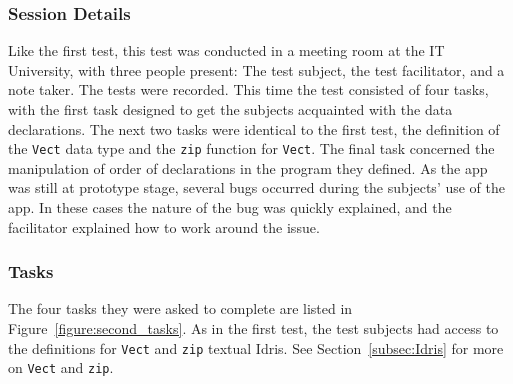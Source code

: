 \subsubsection{Session Details}
Like the first test, this test was conducted in a meeting room at the IT
University, with three people present: The test subject, the test facilitator,
and a note taker. The tests were recorded. This time the test consisted of four
tasks, with the first task designed to get the subjects acquainted with the
data declarations. The next two tasks were identical to the first test, the
definition of the \texttt{Vect} data type and the \texttt{zip} function for
\texttt{Vect}. The final task concerned the manipulation of order of
declarations in the program they defined. As the app was still at prototype
stage, several bugs occurred during the subjects' use of the app. In these
cases the nature of the bug was quickly explained, and the facilitator
explained how to work around the issue.

\subsubsection{Tasks}
The four tasks they were asked to complete are listed in 
Figure~\ref{figure:second_tasks}.
As in the first test, the test subjects had access to the definitions for
\texttt{Vect} and \texttt{zip} textual Idris. See Section~\ref{subsec:Idris}
for more on \texttt{Vect} and \texttt{zip}.

